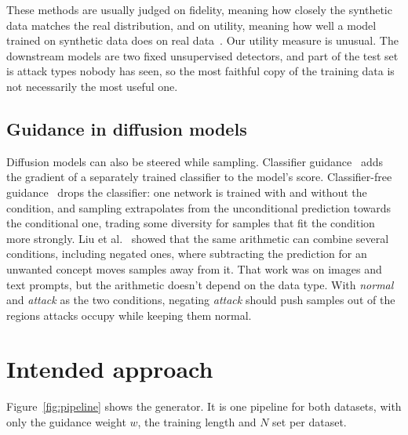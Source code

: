 \documentclass[11pt,a4paper]{article}
\begin{document}
These methods are usually judged on fidelity, meaning how closely the synthetic data matches the real distribution, and on utility, meaning how well a model trained on synthetic data does on real data~\cite{esteban2017tstr}. Our utility measure is unusual. The downstream models are two fixed unsupervised detectors, and part of the test set is attack types nobody has seen, so the most faithful copy of the training data is not necessarily the most useful one.

\subsection{Guidance in diffusion models}

Diffusion models can also be steered while sampling. Classifier guidance~\cite{dhariwal2021beat} adds the gradient of a separately trained classifier to the model's score. Classifier-free guidance~\cite{ho2022cfg} drops the classifier: one network is trained with and without the condition, and sampling extrapolates from the unconditional prediction towards the conditional one, trading some diversity for samples that fit the condition more strongly. Liu et al.~\cite{liu2022composable} showed that the same arithmetic can combine several conditions, including negated ones, where subtracting the prediction for an unwanted concept moves samples away from it. That work was on images and text prompts, but the arithmetic doesn't depend on the data type. With \emph{normal} and \emph{attack} as the two conditions, negating \emph{attack} should push samples out of the regions attacks occupy while keeping them normal.

\section{Intended approach}
\label{sec:approach}

Figure~\ref{fig:pipeline} shows the generator. It is one pipeline for both datasets, with only the guidance weight $w$, the training length and $N$ set per dataset.
\end{document}
